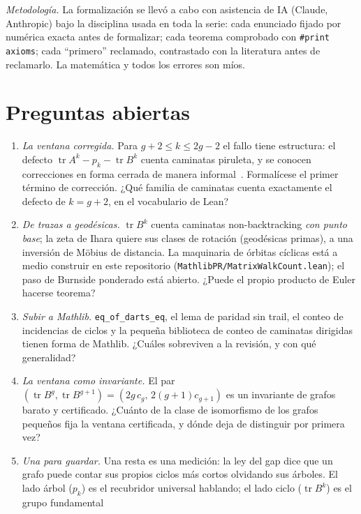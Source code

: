 \documentclass[11pt]{article}
\newcommand{\lean}[1]{\texttt{#1}}
\DeclareMathOperator{\tr}{tr}
\begin{document}
\emph{Metodología.} La formalización se llevó a cabo con asistencia de IA (Claude,
Anthropic) bajo la disciplina usada en toda la serie: cada enunciado fijado por numérica
exacta antes de formalizar; cada teorema comprobado con \lean{\#print axioms}; cada
``primero'' reclamado, contrastado con la literatura antes de reclamarlo. La matemática y
todos los errores son míos.

\section{Preguntas abiertas}
\label{sec:questions}

\begin{enumerate}
\item \emph{La ventana corregida.} Para $g+2 \le k \le 2g-2$ el fallo tiene estructura: el
defecto $\tr A^k - p_k - \tr B^k$ cuenta caminatas piruleta, y se conocen correcciones en
forma cerrada de manera informal~\cite{BlakeLin2018,Dehghan2018}. Formalícese el primer
término de corrección. ¿Qué familia de caminatas cuenta exactamente el defecto de
$k = g+2$, en el vocabulario de Lean?
\item \emph{De trazas a geodésicas.} $\tr B^k$ cuenta caminatas non-backtracking \emph{con
punto base}; la zeta de Ihara quiere sus clases de rotación (geodésicas primas), a una
inversión de M\"obius de distancia. La maquinaria de órbitas cíclicas está a medio construir
en este repositorio (\lean{MathlibPR/MatrixWalkCount.lean}); el paso de Burnside ponderado
está abierto. ¿Puede el propio producto de Euler hacerse teorema?
\item \emph{Subir a Mathlib.} \lean{eq\_of\_darts\_eq}, el lema de paridad sin trail, el
conteo de incidencias de ciclos y la pequeña biblioteca de conteo de caminatas dirigidas
tienen forma de Mathlib. ¿Cuáles sobreviven a la revisión, y con qué generalidad?
\item \emph{La ventana como invariante.} El par $(\tr B^g, \tr B^{g+1}) = (2g\,c_g,\,
2(g{+}1)c_{g+1})$ es un invariante de grafos barato y certificado. ¿Cuánto de la clase de
isomorfismo de los grafos pequeños fija la ventana certificada, y dónde deja de distinguir
por primera vez?
\item \emph{Una para guardar.} Una resta es una medición: la ley del gap dice que un grafo
puede contar sus propios ciclos más cortos olvidando sus árboles. El lado árbol ($p_k$) es
el recubridor universal hablando; el lado ciclo ($\tr B^k$) es el grupo fundamental

\end{enumerate}
\end{document}
